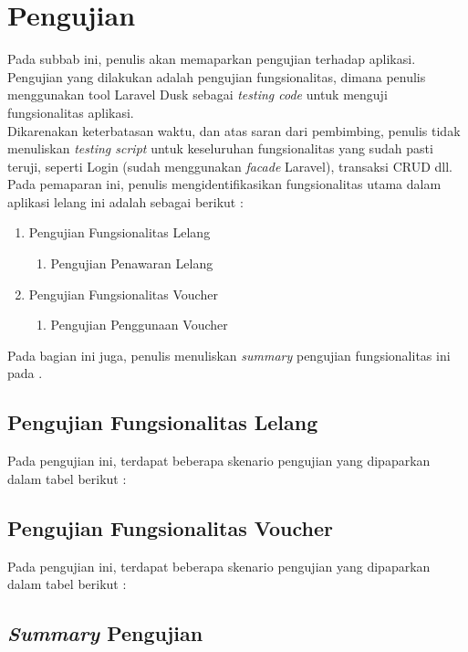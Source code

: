 \section{Pengujian}
	Pada subbab ini, penulis akan memaparkan pengujian terhadap aplikasi. Pengujian yang dilakukan adalah pengujian fungsionalitas, dimana penulis menggunakan tool Laravel Dusk sebagai \textit{testing code} untuk menguji fungsionalitas aplikasi.\\
	\tabularnewline Dikarenakan keterbatasan waktu, dan atas saran dari pembimbing, penulis tidak menuliskan \textit{testing script}	untuk keseluruhan fungsionalitas yang sudah pasti teruji, seperti Login (sudah menggunakan \textit{facade} Laravel), transaksi CRUD dll.\\
	Pada pemaparan ini, penulis mengidentifikasikan fungsionalitas utama dalam aplikasi lelang ini adalah sebagai berikut :
	\begin{enumerate}
		\item Pengujian Fungsionalitas Lelang
			  \begin{enumerate}
			  	\item Pengujian Penawaran Lelang
			  \end{enumerate}
	   \item Pengujian Fungsionalitas Voucher
			  \begin{enumerate}
			  	\item Pengujian Penggunaan Voucher
			  \end{enumerate}
	\end{enumerate}
	
	Pada bagian ini juga, penulis menuliskan \textit{summary} pengujian fungsionalitas ini pada .
	
	\subsection{Pengujian Fungsionalitas Lelang}
		Pada pengujian ini, terdapat beberapa skenario pengujian yang dipaparkan dalam tabel berikut :
		
	
	\subsection{Pengujian Fungsionalitas Voucher}
		Pada pengujian ini, terdapat beberapa skenario pengujian yang dipaparkan dalam tabel berikut :
	
	
	\subsection{\textit{Summary} Pengujian}
		
		